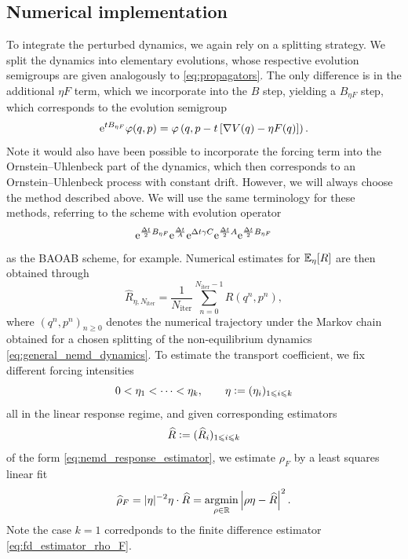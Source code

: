 \subsection{Numerical implementation}
To integrate the perturbed dynamics, we again rely on a splitting strategy.
We split the dynamics into elementary evolutions, whose respective evolution semigroups are given analogously to \eqref{eq:propagators}.
The only difference is in the additional $\eta F$ term, which we incorporate into the $B$ step, yielding a $B_{\eta F}$ step, which corresponds to the evolution semigroup
\begin{equation}
    \label{eq:B_etaF_step}
    \mathrm{e}^{tB_{\eta F}}\varphi(q,p)=\varphi\left(q,p-t\left[\nabla V(q)-\eta F(q)\right]\right).
\end{equation}
Note it would also have been possible to incorporate the forcing term into the Ornstein--Uhlenbeck part of the dynamics, which then corresponds to an Ornstein--Uhlenbeck process with constant drift.
However, we will always choose the method described above. We will use the same terminology for these methods, referring to the scheme with evolution operator
\begin{equation}
    \mathrm{e}^{\frac{{\Delta t}}2B_{\eta F}}\mathrm{e}^{\frac{{\Delta t}}A}\mathrm{e}^{{\Delta t}\gamma C}\mathrm{e}^{\frac{{\Delta t}}2A}\mathrm{e}^{\frac{{\Delta t}}2B_{\eta F}}
\end{equation}
as the BAOAB scheme, for example.
Numerical estimates for $\mathbb{E}_\eta[R]$ are then obtained through 
\begin{equation}
    \label{eq:nemd_response_estimator}
    \widehat{R}_{\eta,N_{\mathrm{iter}}}= \frac{1}{N_{\mathrm{iter}}}\sum_{n=0}^{N_\mathrm{iter}-1} R(q^n,p^n),
\end{equation}
where $(q^n,p^n)_{n\geq 0}$ denotes the numerical trajectory under the Markov chain obtained for a chosen splitting of the non-equilibrium dynamics \eqref{eq:general_nemd_dynamics}.
To estimate the transport coefficient, we fix different forcing intensities
\[0<\eta_1<\dotsm<\eta_k,\qquad \eta\mathrel{\mathop:}= (\eta_i)_{1\leqslant i\leqslant k}\]
all in the linear response regime, and given corresponding estimators 
\[\widehat{R} \mathrel{\mathop:}= (\widehat{R}_i)_{1\leqslant i\leqslant k}\]
of the form \eqref{eq:nemd_response_estimator}, we estimate $\rho_F$ by a least squares linear fit 
\begin{equation}
    \label{eq:rho_F_nemd_estimator}
    \widehat{\rho}_F= |\eta|^{-2}\eta\cdot\widehat{R}= \underset{\rho \in \mathbb{R}}{\mathrm{argmin}} \left| \rho\eta - \widehat{R}\right|^2.
\end{equation}
Note the case $k=1$ corredponds to the finite difference estimator \eqref{eq:fd_estimator_rho_F}. 

